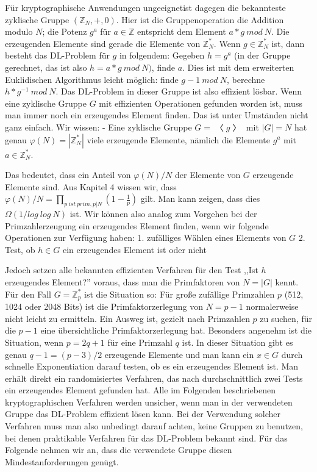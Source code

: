 \documentclass[a4paper]{article}
\begin{document}
\begin{multicols}{3}
{{{{Für kryptographische Anwendungen ungeeignetist dagegen die bekannteste zyklische Gruppe $(\mathbb{Z}_N,+,0)$. Hier ist die Gruppenoperation die Addition modulo $N$; die Potenz $g^a$ für $a\in\mathbb{Z}$ entspricht dem Element $a*g\ mod\ N$. Die erzeugenden Elemente sind gerade die Elemente von $\mathbb{Z}^*_N$. Wenn $g\in\mathbb{Z}^*_N$ ist, dann besteht das DL-Problem für $g$ in folgendem: Gegeben $h=g^a$ (in der Gruppe gerechnet, das ist also $h=a*g\ mod\ N)$, finde $a$. Dies ist mit dem erweiterten Euklidischen Algorithmus leicht möglich: finde $g-1\ mod\ N$, berechne $h*g^{-1}\ mod\ N$. Das DL-Problem in dieser Gruppe ist also effizient lösbar.
Wenn eine zyklische Gruppe $G$ mit effizienten Operationen gefunden worden ist, muss man immer noch ein erzeugendes Element finden. Das ist unter Umständen nicht ganz einfach. Wir wissen:
- Eine zyklische Gruppe $G=〈g〉$ mit $|G|=N$ hat genau $\varphi(N) = |\mathbb{Z}^*_N|$ viele erzeugende Elemente, nämlich die Elemente $g^a$ mit $a\in\mathbb{Z}^*_N$.

Das bedeutet, dass ein Anteil von $\varphi(N)/N$ der Elemente von $G$ erzeugende Elemente sind. Aus Kapitel 4 wissen wir, dass $\varphi(N)/N=\prod_{p\ ist\ prim, p|N}(1-\frac{1}{p})$ gilt. Man kann zeigen, dass dies $\Omega(1/log\ log\ N)$ ist. Wir können also analog zum Vorgehen bei der Primzahlerzeugung ein erzeugendes Element finden, wenn wir folgende Operationen zur Verfügung haben:
1. zufälliges Wählen eines Elements von $G$
2. Test, ob $h\in G$ ein erzeugendes Element ist oder nicht

Jedoch setzen alle bekannten effizienten Verfahren für den Test ,,Ist $h$ erzeugendes Element?'' voraus, dass man die Primfaktoren von $N=|G|$ kennt.
Für den Fall $G=\mathbb{Z}^*_p$ ist die Situation so: Für große zufällige Primzahlen $p$ (512, 1024 oder 2048 Bits) ist die Primfaktorzerlegung von $N=p-1$ normalerweise nicht leicht zu ermitteln. Ein Ausweg ist, gezielt nach Primzahlen $p$ zu suchen, für die $p-1$ eine übersichtliche Primfaktorzerlegung hat. Besonders angenehm ist die Situation, wenn $p=2q+1$ für eine Primzahl $q$ ist.
In dieser Situation gibt es genau $q-1=(p-3)/2$ erzeugende Elemente und man kann ein $x\in G$ durch schnelle Exponentiation darauf testen, ob es ein erzeugendes Element ist. Man erhält direkt ein randomisiertes Verfahren, das nach durchschnittlich zwei Tests ein erzeugendes Element gefunden hat.
Alle im Folgenden beschriebenen kryptographischen Verfahren werden unsicher, wenn man in der verwendeten Gruppe das DL-Problem effizient lösen kann. Bei der Verwendung solcher Verfahren muss man also unbedingt darauf achten, keine Gruppen zu benutzen, bei denen praktikable Verfahren für das DL-Problem bekannt sind. 
Für das Folgende nehmen wir an, dass die verwendete Gruppe diesen Mindestanforderungen genügt.

}}}}
\end{multicols}
\end{document}
